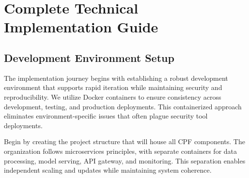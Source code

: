\documentclass[11pt,a4paper]{article}
\begin{document}
\section{Complete Technical Implementation Guide}

\subsection{Development Environment Setup}

The implementation journey begins with establishing a robust development environment that supports rapid iteration while maintaining security and reproducibility. We utilize Docker containers to ensure consistency across development, testing, and production deployments. This containerized approach eliminates environment-specific issues that often plague security tool deployments.

Begin by creating the project structure that will house all CPF components. The organization follows microservices principles, with separate containers for data processing, model serving, API gateway, and monitoring. This separation enables independent scaling and updates while maintaining system coherence.
\end{document}
